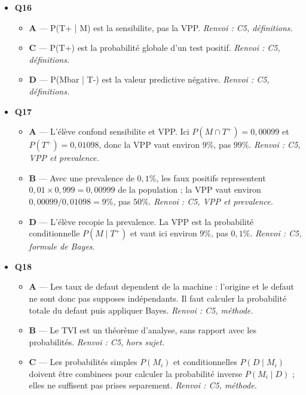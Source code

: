 \begin{itemize}
\begin{itemize}
  \end{itemize}
  \item \textbf{Q16}
  \begin{itemize}
    \item \textbf{A} — P(T+ | M) est la sensibilite, pas la VPP. \emph{Renvoi : C5, définitions.}
    \item \textbf{C} — P(T+) est la probabilité globale d'un test positif. \emph{Renvoi : C5, définitions.}
    \item \textbf{D} — P(Mbar | T-) est la valeur predictive négative. \emph{Renvoi : C5, définitions.}
  \end{itemize}
  \item \textbf{Q17}
  \begin{itemize}
    \item \textbf{A} — L'élève confond sensibilite et VPP. Ici $P(M\cap T^+)=0{,}00099$ et $P(T^+)=0{,}01098$, donc la VPP vaut environ $9\%$, pas $99\%$. \emph{Renvoi : C5, VPP et prevalence.}
    \item \textbf{B} — Avec une prevalence de $0{,}1\%$, les faux positifs representent $0{,}01\times0{,}999=0{,}00999$ de la population ; la VPP vaut environ $0{,}00099/0{,}01098=9\%$, pas $50\%$. \emph{Renvoi : C5, VPP et prevalence.}
    \item \textbf{D} — L'élève recopie la prevalence. La VPP est la probabilité conditionnelle $P(M\mid T^+)$ et vaut ici environ $9\%$, pas $0{,}1\%$. \emph{Renvoi : C5, formule de Bayes.}
  \end{itemize}
  \item \textbf{Q18}
  \begin{itemize}
    \item \textbf{A} — Les taux de defaut dependent de la machine : l'origine et le defaut ne sont donc pas supposes indépendants. Il faut calculer la probabilité totale du defaut puis appliquer Bayes. \emph{Renvoi : C5, méthode.}
    \item \textbf{B} — Le TVI est un théorème d'analyse, sans rapport avec les probabilités. \emph{Renvoi : C5, hors sujet.}
    \item \textbf{C} — Les probabilités simples $P(M_i)$ et conditionnelles $P(D\mid M_i)$ doivent être combinees pour calculer la probabilité inverse $P(M_i\mid D)$ ; elles ne suffisent pas prises separement. \emph{Renvoi : C5, méthode.}
  \end{itemize}
\end{itemize}
\fi
